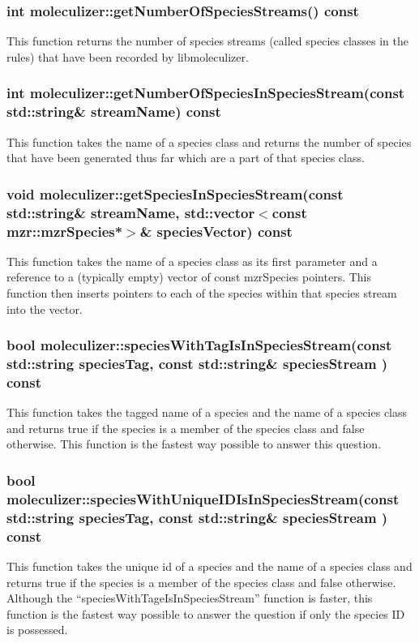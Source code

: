 \subsubsection{int moleculizer::getNumberOfSpeciesStreams() const}
This function returns the number of species streams (called species
classes in the rules) that have been recorded by libmoleculizer.

\subsubsection{int moleculizer::getNumberOfSpeciesInSpeciesStream(const
  std::string\& streamName) const}
This function takes the name of a species class and returns the number
of species that have been generated thus far which are a part of that
species class.

\subsubsection{void moleculizer::getSpeciesInSpeciesStream(const std::string\&
  streamName, std::vector$<$const mzr::mzrSpecies*$>$\& speciesVector)
  const}
This function takes the name of a species class as its first parameter
and a reference to a (typically empty) vector of const mzrSpecies
pointers.  This function then inserts pointers to each of the species
within that species stream into the vector.

\subsubsection{bool moleculizer::speciesWithTagIsInSpeciesStream(const std::string
  speciesTag, const std::string\& speciesStream ) const}
This function takes the tagged name of a species and the name of a
species class and returns true if the species is a member of the
species class and false otherwise.  This function is the fastest way
possible to answer this question.

\subsubsection{bool moleculizer::speciesWithUniqueIDIsInSpeciesStream(const
  std::string speciesTag, const std::string\& speciesStream ) const }
This function takes the unique id of a species and the name of a
species class and returns true if the species is a member of the
species class and false otherwise.  Although the
``speciesWithTageIsInSpeciesStream'' function is faster, this function
is the fastest way possible to answer the question if only the species
ID is possessed.

